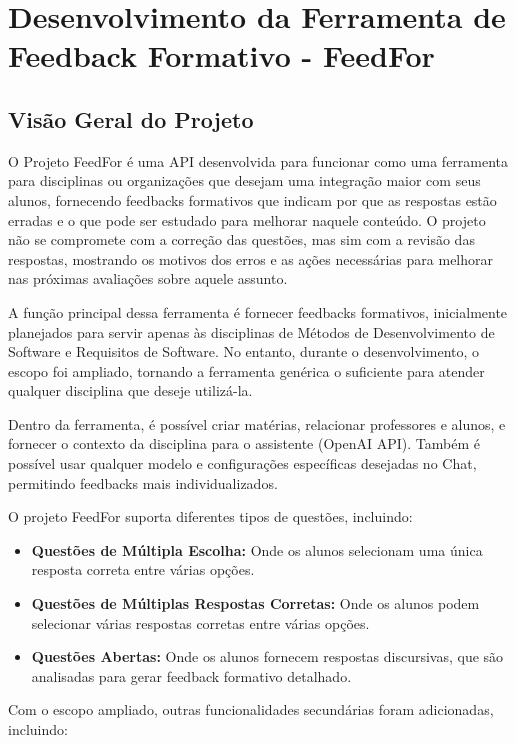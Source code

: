 \chapter{Desenvolvimento da Ferramenta de Feedback Formativo - FeedFor}

\section{Visão Geral do Projeto}

O Projeto FeedFor é uma API desenvolvida para funcionar como uma ferramenta para disciplinas ou organizações que desejam uma integração maior com seus alunos, fornecendo feedbacks formativos que indicam por que as respostas estão erradas e o que pode ser estudado para melhorar naquele conteúdo. O projeto não se compromete com a correção das questões, mas sim com a revisão das respostas, mostrando os motivos dos erros e as ações necessárias para melhorar nas próximas avaliações sobre aquele assunto.

A função principal dessa ferramenta é fornecer feedbacks formativos, inicialmente planejados para servir apenas às disciplinas de Métodos de Desenvolvimento de Software e Requisitos de Software. No entanto, durante o desenvolvimento, o escopo foi ampliado, tornando a ferramenta genérica o suficiente para atender qualquer disciplina que deseje utilizá-la.

Dentro da ferramenta, é possível criar matérias, relacionar professores e alunos, e fornecer o contexto da disciplina para o assistente (OpenAI API). Também é possível usar qualquer modelo e configurações específicas desejadas no Chat, permitindo feedbacks mais individualizados.

O projeto FeedFor suporta diferentes tipos de questões, incluindo:

\begin{itemize}
    \item \textbf{Questões de Múltipla Escolha:} Onde os alunos selecionam uma única resposta correta entre várias opções.
    \item \textbf{Questões de Múltiplas Respostas Corretas:} Onde os alunos podem selecionar várias respostas corretas entre várias opções.
    \item \textbf{Questões Abertas:} Onde os alunos fornecem respostas discursivas, que são analisadas para gerar feedback formativo detalhado.
\end{itemize}

Com o escopo ampliado, outras funcionalidades secundárias foram adicionadas, incluindo:

